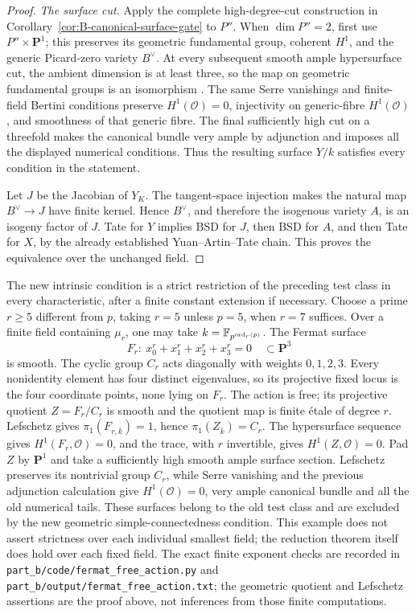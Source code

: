 \begin{proof}
\emph{The surface cut.}
Apply the complete high-degree-cut construction in
Corollary~\ref{cor:B-canonical-surface-gate} to \(P''\).
When \(\dim P''=2\), first use \(P''\times\mathbf P^1\);
this preserves its geometric fundamental group, coherent
\(H^1\), and the generic Picard-zero variety \(B^\vee\).
At every subsequent smooth ample hypersurface cut, the ambient
dimension is at least three, so the map on geometric fundamental
groups is an isomorphism
\citep[Expos\'e~XII, Corollary~3.5, corrected p.~120,
original p.~152]{c_sga2_2005}.
The same Serre vanishings and finite-field Bertini conditions
preserve \(H^1(\mathcal O)=0\), injectivity on generic-fibre
\(H^1(\mathcal O)\), and smoothness of that generic fibre.
The final sufficiently high cut on a threefold makes the
canonical bundle very ample by adjunction and imposes all the
displayed numerical conditions.  Thus the resulting surface
\(Y/k\) satisfies every condition in the statement.

Let \(J\) be the Jacobian of \(Y_K\).  The tangent-space
injection makes the natural map \(B^\vee\to J\) have finite
kernel.  Hence \(B^\vee\), and therefore the isogenous
variety \(A\), is an isogeny factor of \(J\).  Tate for
\(Y\) implies BSD for \(J\), then BSD for \(A\), and then
Tate for \(X\), by the already established Yuan--Artin--Tate
chain.  This proves the equivalence over the unchanged field.
\end{proof}

The new intrinsic condition is a strict restriction of the
preceding test class in every characteristic, after a finite
constant extension if necessary.  Choose a prime \(r\geq5\)
different from \(p\), taking \(r=5\) unless \(p=5\), when
\(r=7\) suffices.  Over a finite field containing \(\mu_r\),
one may take \(k=\mathbb F_{p^{\operatorname{ord}_r(p)}}\).
The Fermat surface
\[
 F_r:\ x_0^r+x_1^r+x_2^r+x_3^r=0\quad\subset\mathbf P^3
\]
is smooth.  The cyclic group \(C_r\) acts diagonally with
weights \(0,1,2,3\).  Every nonidentity element has four
distinct eigenvalues, so its projective fixed locus is the four
coordinate points, none lying on \(F_r\).  The action is free;
its projective quotient \(Z=F_r/C_r\) is smooth and the
quotient map is finite \'etale of degree \(r\).
Lefschetz gives \(\pi_1(F_{r,\overline k})=1\), hence
\(\pi_1(Z_{\overline k})=C_r\).  The hypersurface sequence
gives \(H^1(F_r,\mathcal O)=0\), and the trace, with
\(r\) invertible, gives \(H^1(Z,\mathcal O)=0\).
Pad \(Z\) by \(\mathbf P^1\) and take a sufficiently high
smooth ample surface section.  Lefschetz preserves its
nontrivial group \(C_r\), while Serre vanishing and the
previous adjunction calculation give \(H^1(\mathcal O)=0\),
very ample canonical bundle and all the old numerical tails.
These surfaces belong to the old test class and are excluded by
the new geometric simple-connectedness condition.  This example
does not assert strictness over each individual smallest field;
the reduction theorem itself does hold over each fixed field.
The exact finite exponent checks are recorded in
\texttt{part\_b/code/fermat\_free\_action.py} and
\texttt{part\_b/output/fermat\_free\_action.txt}; the geometric
quotient and Lefschetz assertions are the proof above, not
inferences from those finite computations.
